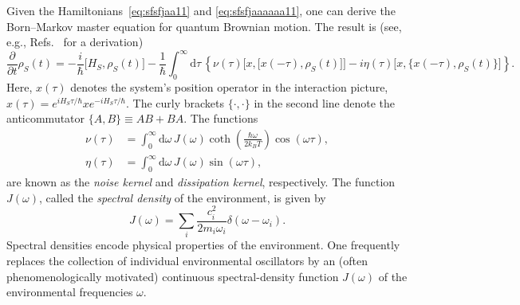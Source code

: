 \documentclass[3p,sort&compress]{elsarticle}
\newcommand{\D}{\ensuremath{\mathrm{d}}}
\newcommand{\E}{\ensuremath{e}}
\newcommand{\I}{\ensuremath{i}}
\newcommand{\op}[1]{#1}
\begin{document}
Given the Hamiltonians~\eqref{eq:sfsfjaa11} and \eqref{eq:sfsfjaaaaaa11}, one can derive the Born--Markov master equation for quantum Brownian motion. The result is (see, e.g., Refs.~\cite{Breuer:2002:oq,Schlosshauer:2007:un} for a derivation)
%
\begin{equation}
\label{eq:vjp32q22}
  \frac{\partial}{\partial t} \op{\rho}_S(t) 
  = -\frac{\I}{\hbar} \bigl[ \op{H}_S, \op{\rho}_S(t) \bigr]  -
  \frac{1}{\hbar} \int_0^\infty \D \tau \, \left\{ \nu(\tau) \bigl[ x, \bigl[
      x(-\tau), \op{\rho}_S(t) \bigr]\bigr] - \I \eta(\tau) \bigl[ x,
    \bigl\{ x(-\tau), \op{\rho}_S(t)
    \bigr\}\bigr] \right\}.
\end{equation}
%
Here, $x(\tau)$ denotes the system's position operator in the interaction picture, $x(\tau) = \E^{\I \op{H}_S\tau/\hbar} x\E^{-\I \op{H}_S\tau/\hbar}$. The curly brackets $\{\cdot , \cdot \}$ in the second line denote the anticommutator $\{ A, B \} \equiv AB + BA$. The functions
%
\begin{align}
  \nu(\tau) &= \int_0^\infty \D \omega
  \, J(\omega) \coth
  \left(\frac{\hbar\omega}{2k_B T}\right) \cos \left(\omega\tau\right), \label{eq:vdjpoo17} \\
  \eta(\tau) &= \int_0^\infty \D \omega\, J(\omega)
  \sin\left(\omega\tau\right), \label{eq:ponol218}
\end{align}
%
are known as the \emph{noise kernel} and \emph{dissipation kernel}, respectively. The function $J(\omega)$, called the \emph{spectral density} of the environment, is given by 
%
\begin{equation}
\label{eq:vdfpmdmv16}
  J(\omega) = \sum_i  \frac{c_i^2}{2m_i\omega_i} \delta(\omega-\omega_i).
\end{equation}
%
Spectral densities encode physical properties of the environment. One frequently replaces the collection of individual environmental oscillators by an (often phenomenologically motivated) continuous spectral-density function $J(\omega)$ of the environmental frequencies $\omega$. 
\end{document}
